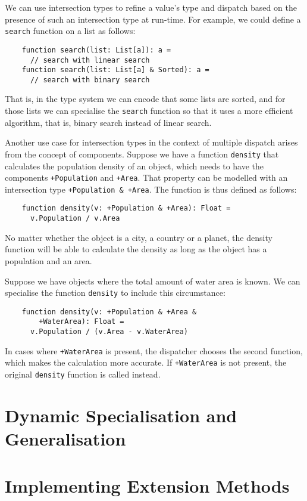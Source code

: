 We can use intersection types to refine a value's type and dispatch based on the presence of such an intersection type at run-time. For example, we could define a \texttt{search} function on a list as follows:
\begin{lstlisting}
    function search(list: List[a]): a =
      // search with linear search
    function search(list: List[a] & Sorted): a =
      // search with binary search
\end{lstlisting}

\noindent That is, in the type system we can encode that some lists are sorted, and for those lists we can specialise the \texttt{search} function so that it uses a more efficient algorithm, that is, binary search instead of linear search.

\medskip

\noindent Another use case for intersection types in the context of multiple dispatch arises from the concept of components. Suppose we have a function \texttt{density} that calculates the population density of an object, which needs to have the components \texttt{+Population} and \texttt{+Area}. That property can be modelled with an intersection type \texttt{+Population \& +Area}. The function is thus defined as follows:
\begin{lstlisting}
    function density(v: +Population & +Area): Float = 
      v.Population / v.Area
\end{lstlisting}

\noindent No matter whether the object is a city, a country or a planet, the density function will be able to calculate the density as long as the object has a population and an area.

Suppose we have objects where the total amount of water area is known. We can specialise the function \texttt{density} to include this circumstance:
\begin{lstlisting}
    function density(v: +Population & +Area & 
        +WaterArea): Float =
      v.Population / (v.Area - v.WaterArea)
\end{lstlisting}

\noindent In cases where \texttt{+WaterArea} is present, the dispatcher chooses the second function, which makes the calculation more accurate. If \texttt{+WaterArea} is not present, the original \texttt{density} function is called instead.



\section{Dynamic Specialisation and Generalisation}




\section{Implementing Extension Methods}




